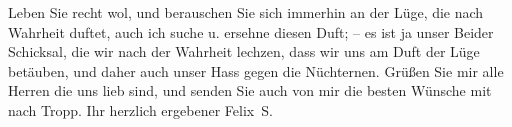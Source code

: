 \begin{ledgroupsized}[t]{13cm}
           \pstart
           Leben Sie recht wol, und berauschen Sie sich immerhin an der Lüge, die nach Wahrheit
               duftet, auch ich suche u. ersehne diesen Duft; – es ist ja unser Beider Schicksal,
               die wir nach der Wahrheit lechzen, dass wir uns am Duft der Lüge betäuben, und daher
               auch unser Hass gegen die Nüchternen. \pend
           \pstart
           Grüßen Sie mir alle Herren die uns lieb sind, und senden Sie auch von mir die besten
               Wünsche mit nach Tropp. \pend
           \pstart  Ihr herzlich ergebener \spacefill\mbox{Felix S.}\pend{}
         
         \endnumbering{}\end{ledgroupsized}\begin{anhang}\end{anhang}\newcommand{\dateiname}{L03105}\newcommand{\titel}{Felix Salten an Arthur Schnitzler, 12. 9. 1891}\newcommand{\editorInnen}{Martin Anton Müller und Laura Untner}
      